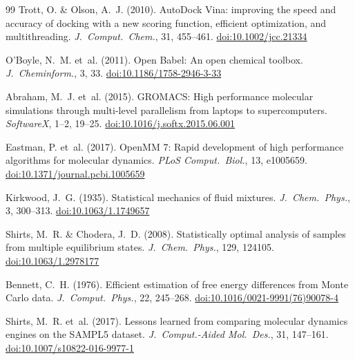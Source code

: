 \documentclass[11pt,a4paper]{article}
\begin{document}
\begin{thebibliography}{99}
Trott, O. \& Olson, A.~J. (2010).
\newblock AutoDock Vina: improving the speed and accuracy of docking with a new scoring function, efficient optimization, and multithreading.
\newblock \textit{J.\ Comput.\ Chem.}, 31, 455--461.
\newblock \href{https://doi.org/10.1002/jcc.21334}{doi:10.1002/jcc.21334}

O'Boyle, N.~M. et~al. (2011).
\newblock Open Babel: An open chemical toolbox.
\newblock \textit{J.\ Cheminform.}, 3, 33.
\newblock \href{https://doi.org/10.1186/1758-2946-3-33}{doi:10.1186/1758-2946-3-33}

Abraham, M.~J. et~al. (2015).
\newblock GROMACS: High performance molecular simulations through multi-level parallelism from laptops to supercomputers.
\newblock \textit{SoftwareX}, 1--2, 19--25.
\newblock \href{https://doi.org/10.1016/j.softx.2015.06.001}{doi:10.1016/j.softx.2015.06.001}

Eastman, P. et~al. (2017).
\newblock OpenMM 7: Rapid development of high performance algorithms for molecular dynamics.
\newblock \textit{PLoS Comput.\ Biol.}, 13, e1005659.
\newblock \href{https://doi.org/10.1371/journal.pcbi.1005659}{doi:10.1371/journal.pcbi.1005659}

Kirkwood, J.~G. (1935).
\newblock Statistical mechanics of fluid mixtures.
\newblock \textit{J.\ Chem.\ Phys.}, 3, 300--313.
\newblock \href{https://doi.org/10.1063/1.1749657}{doi:10.1063/1.1749657}

Shirts, M.~R. \& Chodera, J.~D. (2008).
\newblock Statistically optimal analysis of samples from multiple equilibrium states.
\newblock \textit{J.\ Chem.\ Phys.}, 129, 124105.
\newblock \href{https://doi.org/10.1063/1.2978177}{doi:10.1063/1.2978177}

Bennett, C.~H. (1976).
\newblock Efficient estimation of free energy differences from Monte Carlo data.
\newblock \textit{J.\ Comput.\ Phys.}, 22, 245--268.
\newblock \href{https://doi.org/10.1016/0021-9991(76)90078-4}{doi:10.1016/0021-9991(76)90078-4}

Shirts, M.~R. et~al. (2017).
\newblock Lessons learned from comparing molecular dynamics engines on the SAMPL5 dataset.
\newblock \textit{J.\ Comput.-Aided Mol.\ Des.}, 31, 147--161.
\newblock \href{https://doi.org/10.1007/s10822-016-9977-1}{doi:10.1007/s10822-016-9977-1}


\end{thebibliography}
\end{document}
